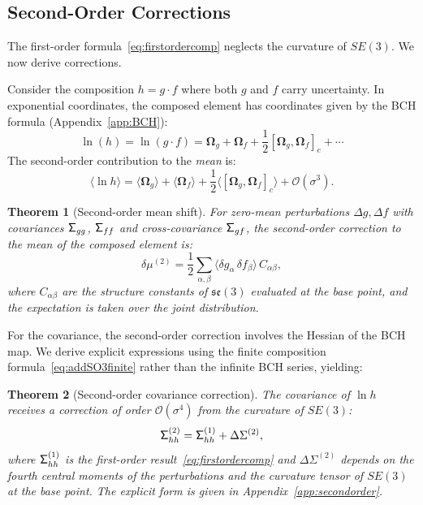 \documentclass[journal]{IEEEtran}
\newcommand{\bfOmega}{\boldsymbol{\Omega}}
\newcommand{\sfSigma}[1]{\mathsf{\Sigma}_\mathnormal{#1}}
\newcommand{\beq}{\begin{equation}}
\newcommand{\eeq}{\end{equation}}
\newtheorem{theorem}{Theorem}
\begin{document}
\subsection{Second-Order Corrections}
\label{subsec:secondorder}

The first-order formula~\eqref{eq:firstordercomp} neglects 
the curvature of $SE(3)$. We now derive corrections.

Consider the composition $h = g \cdot f$ where both 
$g$ and $f$ carry uncertainty. In exponential coordinates, 
the composed element has coordinates given by the 
BCH formula (Appendix~\ref{app:BCH}):
\beq
    \ln(h) = \ln(g \cdot f) = 
    \bfOmega_g + \bfOmega_f + 
    \frac{1}{2}[\bfOmega_g, \bfOmega_f]_c + \cdots
\eeq
The second-order contribution to the \emph{mean} is:
\beq
    \langle \ln h \rangle = 
    \langle \bfOmega_g \rangle + \langle \bfOmega_f \rangle +
    \frac{1}{2} \langle [\bfOmega_g, \bfOmega_f]_c \rangle + 
    \mathcal{O}(\sigma^3).
    \label{eq:secondordermean}
\eeq

\begin{theorem}[Second-order mean shift]
\label{thm:meanshift}
For zero-mean perturbations $\Delta g, \Delta f$ with 
covariances $\sfSigma{gg}$, $\sfSigma{ff}$ and 
cross-covariance $\sfSigma{gf}$, the second-order 
correction to the mean of the composed element is:
\beq
    \delta\mu^{(2)} = \frac{1}{2}
    \sum_{\alpha,\beta} \langle \delta g_\alpha \, \delta f_\beta \rangle\,
    C_{\alpha\beta},
    \label{eq:meancorrection}
\eeq
where $C_{\alpha\beta}$ are the structure constants 
of $\mathfrak{se}(3)$ evaluated at the base point, 
and the expectation is taken over the joint distribution.
\end{theorem}

For the covariance, the second-order correction involves 
the Hessian of the BCH map. We derive explicit expressions 
using the finite composition formula~\eqref{eq:addSO3finite} 
rather than the infinite BCH series, yielding:

\begin{theorem}[Second-order covariance correction]
\label{thm:covcorrection}
The covariance of $\ln h$ receives a correction of order 
$\mathcal{O}(\sigma^4)$ from the curvature of $SE(3)$:
\beq
    \sfSigma{hh}^{(2)} = \sfSigma{hh}^{(1)} + 
    \Delta\Sigma^{(2)},
\eeq
where $\sfSigma{hh}^{(1)}$ is the first-order 
result~\eqref{eq:firstordercomp} and $\Delta\Sigma^{(2)}$ 
depends on the fourth central moments of the perturbations 
and the curvature tensor of $SE(3)$ at the base point.
The explicit form is given in Appendix~\ref{app:secondorder}.
\end{theorem}
\end{document}
